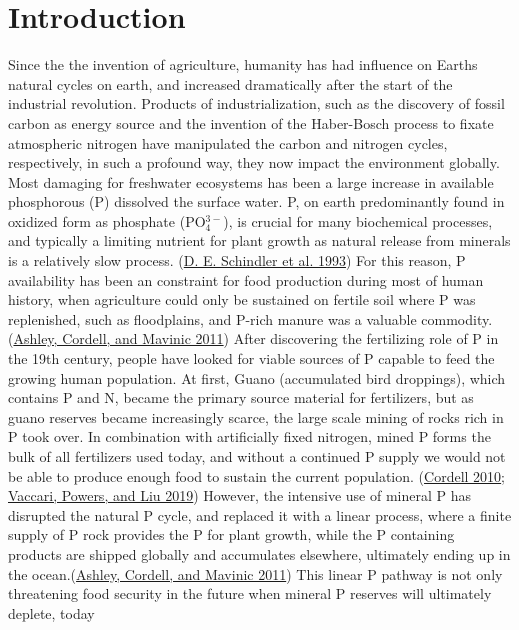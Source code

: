 \documentclass[a4paper,11pt]{article}
\begin{document}

\newpage
\pagestyle{plain}       
\setcounter{page}{1}    %

\hypertarget{introduction}{%
\section{Introduction}\label{introduction}}

Since the the invention of agriculture, humanity has had influence on Earths natural cycles on earth, and increased dramatically after the start of the industrial revolution. Products of industrialization, such as the discovery of fossil carbon as energy source and the invention of the Haber-Bosch process to fixate atmospheric nitrogen have manipulated the carbon and nitrogen cycles, respectively, in such a profound way, they now impact the environment globally. Most damaging for freshwater ecosystems has been a large increase in available phosphorous (P) dissolved the surface water. P, on earth predominantly found in oxidized form as phosphate (PO\(_4^{3-}\)), is crucial for many biochemical processes, and typically a limiting nutrient for plant growth as natural release from minerals is a relatively slow process. (\protect\hyperlink{ref-schindlerFoodWebStructure1993}{D. E. Schindler et al. 1993}) For this reason, P availability has been an constraint for food production during most of human history, when agriculture could only be sustained on fertile soil where P was replenished, such as floodplains, and P-rich manure was a valuable commodity. (\protect\hyperlink{ref-ashleyBriefHistoryPhosphorus2011}{Ashley, Cordell, and Mavinic 2011}) After discovering the fertilizing role of P in the 19th century, people have looked for viable sources of P capable to feed the growing human population. At first, Guano (accumulated bird droppings), which contains P and N, became the primary source material for fertilizers, but as guano reserves became increasingly scarce, the large scale mining of rocks rich in P took over. In combination with artificially fixed nitrogen, mined P forms the bulk of all fertilizers used today, and without a continued P supply we would not be able to produce enough food to sustain the current population. (\protect\hyperlink{ref-cordell2010}{Cordell 2010}; \protect\hyperlink{ref-vaccariDemandDrivenModelGlobal2019}{Vaccari, Powers, and Liu 2019}) However, the intensive use of mineral P has disrupted the natural P cycle, and replaced it with a linear process, where a finite supply of P rock provides the P for plant growth, while the P containing products are shipped globally and accumulates elsewhere, ultimately ending up in the ocean.(\protect\hyperlink{ref-ashleyBriefHistoryPhosphorus2011}{Ashley, Cordell, and Mavinic 2011}) This linear P pathway is not only threatening food security in the future when mineral P reserves will ultimately deplete, today 
\end{document}
